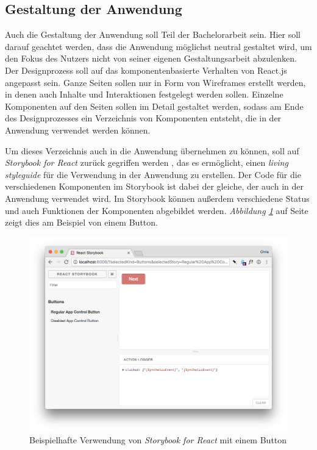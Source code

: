 \subsection{Gestaltung der Anwendung}
Auch die Gestaltung der Anwendung soll Teil der Bachelorarbeit sein. Hier soll darauf geachtet werden, dass die Anwendung möglichst neutral gestaltet wird, um den Fokus des Nutzers nicht von seiner eigenen Gestaltungsarbeit abzulenken.\\
Der Designprozess soll auf das komponentenbasierte Verhalten von React.js angepasst sein. Ganze Seiten sollen  nur in Form von Wireframes erstellt werden, in denen auch Inhalte und Interaktionen festgelegt werden sollen. Einzelne Komponenten auf den Seiten sollen im Detail gestaltet werden, sodass am Ende des Designprozesses ein Verzeichnis von Komponenten entsteht, die in der Anwendung verwendet werden können.

Um dieses Verzeichnis auch in die Anwendung übernehmen zu können, soll auf \textit{Storybook for React} zurück gegriffen werden \cite{StorybooksOnline}, das es ermöglicht, einen \textit{living styleguide} für die Verwendung in der Anwendung zu erstellen. Der Code für die verschiedenen Komponenten im Storybook ist dabei der gleiche, der auch in der Anwendung verwendet wird. Im Storybook können außerdem verschiedene Status und auch Funktionen der Komponenten abgebildet werden. \textit{Abbildung \ref{fig:storybook}} auf Seite \pageref{fig:storybook} zeigt dies am Beispiel von einem Button.

\begin{figure}[h]
  \centering
  \includegraphics[width=1\textwidth]{images/ReactStroybooksExample.png}
  \caption{Beispielhafte Verwendung von \textit{Storybook for React} mit einem Button}
  \label{fig:storybook}
\end{figure}

